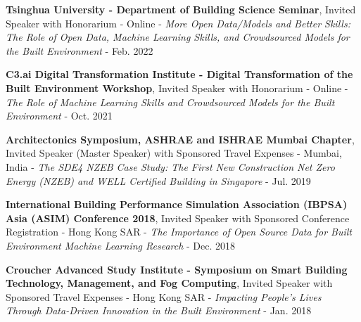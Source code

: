 \documentclass[10pt,a4paper]{article}
\begin{document}
\begin{small}
\begin{etaremune}
\item
\textbf{Tsinghua University - Department of Building Science Seminar}, Invited Speaker with Honorarium - Online - \emph{More Open Data/Models and Better Skills: The Role of Open Data, Machine Learning Skills, and Crowdsourced Models for the Built Environment} - Feb. 2022
\item
\textbf{C3.ai Digital Transformation Institute - Digital Transformation of the Built Environment Workshop}, Invited Speaker with Honorarium - Online - \emph{The Role of Machine Learning Skills and Crowdsourced Models for the Built Environment} - Oct. 2021
\item
\textbf{Architectonics Symposium, ASHRAE and ISHRAE Mumbai Chapter}, Invited Speaker (Master Speaker) with Sponsored Travel Expenses - Mumbai, India - \emph{The SDE4 NZEB Case Study: The First New Construction Net Zero Energy (NZEB) and WELL Certified Building in Singapore} - Jul. 2019   
\item
\textbf{International Building Performance Simulation Association (IBPSA) Asia (ASIM) Conference 2018}, Invited Speaker with Sponsored Conference Registration - Hong Kong SAR - \emph{The Importance of Open Source Data for Built Environment Machine Learning Research} - Dec. 2018
\item
\textbf{Croucher Advanced Study Institute - Symposium on Smart Building Technology, Management, and Fog Computing}, Invited Speaker with Sponsored Travel Expenses - Hong Kong SAR - \emph{Impacting People’s Lives Through Data-Driven Innovation in the Built Environment} - Jan. 2018
\end{etaremune}



\end{small}
\end{document}
